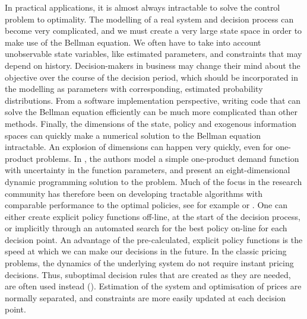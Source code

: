 \documentclass[main.tex]{subfiles}
\begin{document}
In practical applications, it is almost always
intractable to solve the control problem to optimality.
The modelling of a real system and decision process can become very
complicated, and  we must  create a very
large state space in order to make use of the Bellman equation.
We often have to take into account unobservable
state variables, like estimated parameters, and constraints
that may depend on history. Decision-makers in business may change their mind
about the objective over the course of the decision period, which should
be incorporated in the modelling as parameters with corresponding, estimated
probability distributions.
From a software implementation perspective, writing code that can
solve the Bellman equation efficiently can be much more complicated
than other methods.
Finally, the dimensions of the state, policy and exogenous
information spaces can quickly make a numerical solution to the Bellman
equation intractable. An explosion of dimensions can happen very
quickly, even for one-product problems. In
\citet{bertsimas2001dynamic}, the authors model a simple
one-product demand function with uncertainty in the function
parameters, and present an eight-dimensional dynamic programming
solution to the problem.
Much of the focus in the research community has therefore been on
developing tractable algorithms with comparable performance to the
optimal policies, see for example
\citet{powell2011approximate} or \citet{bertsekas2012dynamic}.
One can either create explicit policy functions off-line, at the
start of the decision process, or implicitly through an automated
search for the best policy on-line for each decision point.
An advantage of the pre-calculated, explicit policy functions
is the speed at which we can make our decisions in the
future. In the classic pricing problems, the dynamics of the
underlying system do not require instant pricing decisions. Thus,
suboptimal decision rules that are created as they are needed, are often used
instead (\citet{talluri2006theory}). Estimation of the system and optimisation of prices are
normally separated, and constraints are more easily updated at each
decision point.
\end{document}
